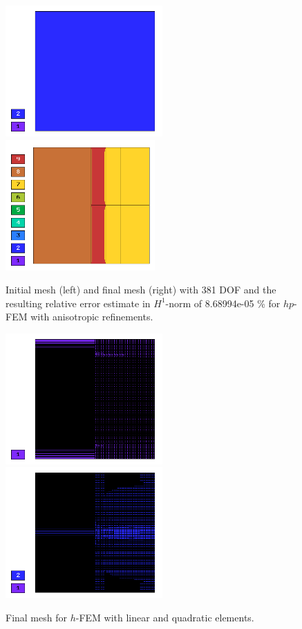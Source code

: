 \begin{figure}[!ht]
\centering
\includegraphics[height=5cm]{nist/nist-10/mesh_hp_aniso_init.png}\ \
\includegraphics[height=5cm]{nist/nist-10/mesh_hp_aniso.png}
\caption{Initial mesh (left) and final mesh (right) with 381 DOF and the resulting relative error estimate in $H^1$-norm of 8.68994e-05 \% for $hp$-FEM with anisotropic refinements.}
\label{fig:nist-10-hp-aniso}
\end{figure}

\begin{figure}[!ht]
\centering
\includegraphics[height=5cm]{nist/nist-10/mesh_h1_aniso.png}\ \
\includegraphics[height=5cm]{nist/nist-10/mesh_h2_aniso.png}
\caption{Final mesh for $h$-FEM with linear and quadratic elements.}
\label{fig:nist-10-h-aniso}
\end{figure}

